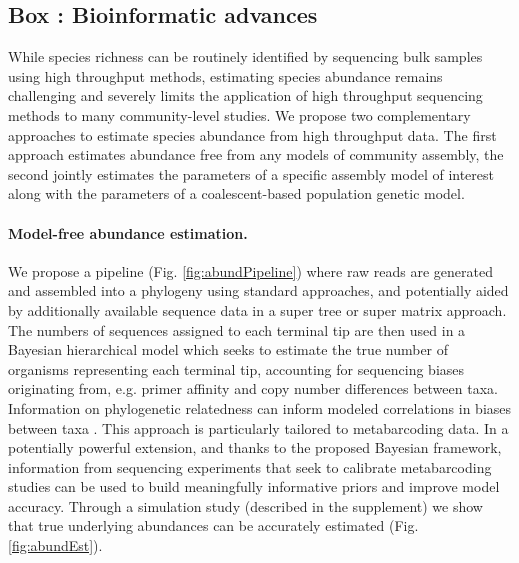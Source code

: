 \documentclass[12pt]{article}
\newcounter{Box}
\begin{document}
\label{box:dry}
\subsection*{Box \theBox: Bioinformatic advances}

While species richness can be routinely identified by sequencing bulk
samples using high throughput methods, estimating species abundance
remains challenging \citep{elbrecht2015} and severely limits the
application of high throughput sequencing methods to many
community-level studies. We propose two complementary approaches to
estimate species abundance from high throughput data.  The first
approach estimates abundance free from any models of community
assembly, the second jointly estimates the parameters of a specific
assembly model of interest along with the parameters of a
coalescent-based population genetic model.

\paragraph{Model-free abundance estimation.} We propose a pipeline
(Fig. \ref{fig:abundPipeline}) where raw reads are generated and
assembled into a phylogeny using standard approaches, and potentially
aided by additionally available sequence data in a super tree or super
matrix approach. The numbers of sequences assigned to each terminal
tip are then used in a Bayesian hierarchical model which seeks to
estimate the true number of organisms representing each terminal tip,
accounting for sequencing biases originating from, e.g. primer
affinity and copy number differences between taxa.  Information on
phylogenetic relatedness can inform modeled correlations in biases
between taxa \citep[e.g. copy number is known to be phylogenetically
conserved at least in microbes]{angly2014}. This approach is
particularly tailored to metabarcoding data. In a potentially powerful
extension, and thanks to the proposed Bayesian framework, information
from sequencing experiments that seek to calibrate metabarcoding
studies \citep[e.g.,][]{krehenwinkel2016} can be used to
build meaningfully informative priors and improve model
accuracy. Through a simulation study (described in the supplement) we
show that true underlying abundances can be accurately estimated
(Fig. \ref{fig:abundEst}).
\end{document}

